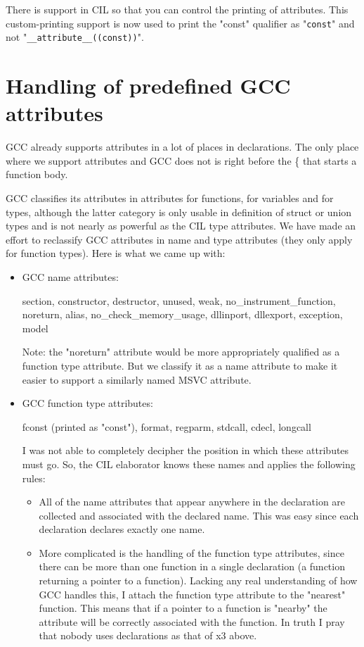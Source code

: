 \documentclass{book}
\def\t#1{{\tt #1}}
\begin{document}
 There is support in CIL so that you can control the printing of attributes.
This custom-printing support is now used to print the "const" qualifier as
"\t{const}" and not "\t{\_\_attribute\_\_((const))}". 


 \section{Handling of predefined GCC attributes}

 GCC already supports attributes in a lot of places in declarations. The only
place where we support attributes and GCC does not is right before the \{ that
starts a function body. 

 GCC classifies its attributes in attributes for functions, for variables and
for types, although the latter category is only usable in definition of struct
or union types and is not nearly as powerful as the CIL type attributes. We
have made an effort to reclassify GCC attributes in name and type attributes
(they only apply for function types). Here is what we came up with:

\begin{itemize}
  \item GCC name attributes:
   
   section, constructor, destructor, unused, weak, no\_instrument\_function,
   noreturn, alias, no\_check\_memory\_usage, dllinport, dllexport, exception,
   model

      Note: the "noreturn" attribute would be more appropriately qualified as a
      function type attribute. But we classify it as a name attribute to make
      it easier to support a similarly named MSVC attribute. 
  
  \item GCC function type attributes:

    fconst (printed as "const"), format, regparm, stdcall,
    cdecl, longcall

  I was not able to completely decipher the position in which these attributes
  must go. So, the CIL elaborator knows these names and applies the following
  rules: 
  \begin{itemize}
  \item All of the name attributes that appear anywhere in the declaration are
  collected and associated with the declared name. This was easy since each
  declaration declares exactly one name.

  \item More complicated is the handling of the function type attributes, since
     there can be more than one function in a single declaration (a function
     returning a pointer to a function). Lacking any real understanding of how
     GCC handles this, I attach the function type attribute to the "nearest"
     function. This means that if a pointer to a function is "nearby" the
     attribute will be correctly associated with the function. In truth I pray
     that nobody uses declarations as that of x3 above. 
  \end{itemize}
\end{itemize}
\end{document}
